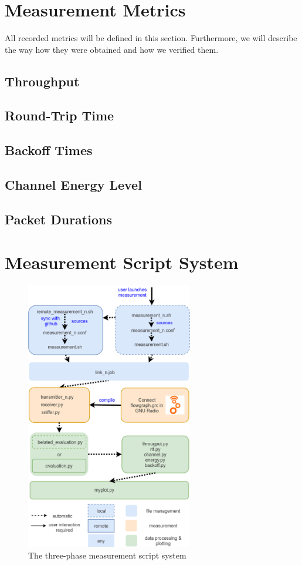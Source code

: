 \clearpage

\section{Measurement Metrics}
\label{sec:measurement-metrics}

All recorded metrics will be defined in this section. Furthermore, we will describe the way how they were obtained and how we verified them.

\subsection{Throughput}

\subsection{Round-Trip Time}

\subsection{Backoff Times}

\subsection{Channel Energy Level}

\subsection{Packet Durations}

\section{Measurement Script System}
\label{sec:script-system}

\begin{figure}[ht]
	\label{fig:script-system}
	\begin{center}
		\includegraphics[width=0.65\textwidth]{pictures/script_system}
	\end{center}
	\caption{The three-phase measurement script system}
\end{figure}